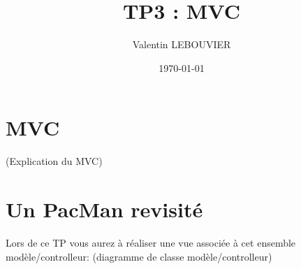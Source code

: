 \documentclass{article}
\author{Valentin LEBOUVIER}
\date{\today}
\title{TP3 : MVC}
\begin{document}
\maketitle

\section{MVC}
\label{sec-1}
(Explication du MVC)

\section{Un PacMan revisité}
\label{sec-2}
Lors de ce TP vous aurez à réaliser une vue associée à cet ensemble modèle/controlleur:
(diagramme de classe modèle/controlleur)
\end{document}
